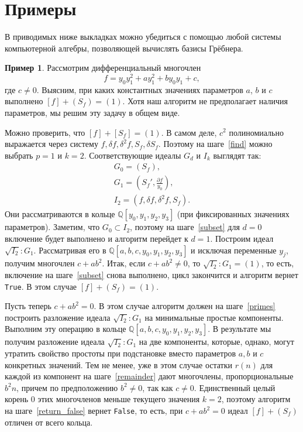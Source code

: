 \documentclass[11pt]{article}
\theoremstyle{plain}
\theoremstyle{definition}
\newtheorem{example}[theorem3]{Пример}
\theoremstyle{remark}
\begin{document}
\section{Примеры}
В приводимых ниже выкладках можно убедиться с помощью любой системы компьютерной алгебры, позволяющей вычислять базисы Грёбнера.

\label{examples}
\begin{example}\label{example:first}
Рассмотрим дифференциальный многочлен 
$$
f= y_0 y_1^2+ay_1^2+by_0 y_1+c,
$$
где $c \ne 0$.
Выясним, при каких константных значениях параметров $a$, $b$ и $c$ выполнено $[f]+(S_f)=(1)$.
Хотя наш алгоритм не предполагает наличия параметров, мы решим эту задачу в общем виде.

Можно проверить, что $[f] + [S_f] = (1)$.
В самом деле, $c^2$ полиномиально выражается через систему $f, \delta f, \delta^2 f, S_f, \delta {S_f}$.
Поэтому на шаге~\ref{find} можно выбрать $p = 1$ и $k=2$.
Соответствующие идеалы $G_d$ и $I_k$ выглядят так:
\begin{gather*}
G_0 = (S_f),\\
G_1 = \left({S_f}', \frac{\partial f}{y_0} \right),\\
I_2 = \left(f, \delta f, \delta^2 f, S_f\right).
\end{gather*}
Они рассматриваются в кольце $\mathbb{Q}[y_0, y_1, y_2, y_3]$ (при фиксированных значениях параметров).
Заметим, что $G_0 \subset I_2$, поэтому на шаге~\ref{subset} для $d=0$ включение будет выполнено и алгоритм перейдет к $d=1$.
Построим идеал $\sqrt{I_2}:G_1$.
Рассматривая его в $\mathbb{Q}[a,b,c,y_0,y_1, y_2, y_3]$ и исключая переменные $y_j$, получим многочлен $c + a b^2$.
Итак, если $c + ab^2 \ne 0$, то $\sqrt{I_2}:G_1 = (1)$, то есть, включение на шаге~\ref{subset} снова выполнено,
цикл закончится и алгоритм вернет \verb'True'. В этом случае $[f] + (S_f) = (1)$.

Пусть теперь $c + a b^2 = 0$.
В этом случае алгоритм должен на шаге~\ref{primes} построить разложение идеала $\sqrt{I_2}:G_1$
на минимальные простые компоненты. 
Выполним эту операцию в кольце $\mathbb{Q}[a,b,c,y_0,y_1,y_2,y_3]$.
В результате мы получим разложение идеала $\sqrt{I_2}:G_1$ на две компоненты,
которые, однако, могут утратить свойство простоты при подстановке вместо параметров $a, b$ и $c$ конкретных значений.
Тем не менее, уже в этом случае остатки $r(n)$ для каждой из компонент на шаге~\ref{remainder} дают многочлены,
пропорциональные $b^2 n$, причем по предположению $b^2 \ne 0$, так как $c \ne 0$.
Единственный целый корень $0$ этих многочленов меньше текущего значения $k = 2$,
поэтому алгоритм на шаге~\ref{return_false} вернет \verb'False', то есть,
при $c + a b^2 = 0$ идеал $[f] + (S_f)$ отличен от всего кольца.
\end{example}
\end{document}
